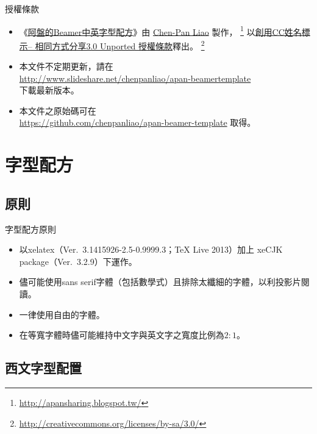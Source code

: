 \documentclass[10pt, aspectratio=1610]{beamer}
\let\oldfootnote\footnote
\renewcommand\footnote[1]{\hspace{-0.7em}\oldfootnote{\ignorespaces#1}\hspace{0.5em}}
\begin{document}
\begin{frame}{授權條款}
\begin{center}
\end{center}
\begin{itemize}
  \item 《\href{%
  http://www.scribd.com/doc/83967053/Apan-s-Beamer-Template%
}{阿盤的Beamer中英字型配方}》由 
  \href{http://apansharing.blogspot.tw/}{\alert{Chen-Pan Liao}}
  製作，%
  \footnote{\url{http://apansharing.blogspot.tw/}}
  以\href{http://creativecommons.org/licenses/by-sa/3.0/}%
  {\alert{創用CC姓名標示-- 相同方式分享3.0 Unported 授權條款}}釋出。%
  \footnote{\url{http://creativecommons.org/licenses/by-sa/3.0/}}\\

  \item 本文件不定期更新，請在\\
\url{http://www.slideshare.net/chenpanliao/apan-beamertemplate}\\
下載最新版本。

  \item 本文件之原始碼可在\\
        \url{https://github.com/chenpanliao/apan-beamer-template} 取得。
\end{itemize}
\end{frame}

\section{字型配方}

\subsection{原則}

\begin{frame}{字型配方原則}
\begin{itemize}
\item 以xelatex（Ver.~3.1415926-2.5-0.9999.3；TeX Live 2013）加上
      xeCJK package（Ver.~3.2.9）下運作。
\item 儘可能使用sans serif字體（包括數學式）且排除太纖細的字體，以利投影片閱讀。
\item 一律使用自由的字體。
\item 在等寬字體時儘可能維持中文字與英文字之寬度比例為$2:1$。
\end{itemize}
\end{frame}


\subsection{西文字型配置}
\end{document}
